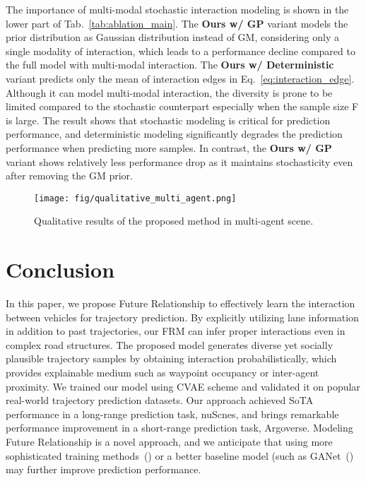 \documentclass{article} \usepackage{iclr2023_conference,times}
\begin{document}
The importance of multi-modal stochastic interaction modeling is shown in the lower part of Tab.~\ref{tab:ablation_main}.
The \textbf{Ours w/ GP} variant models the prior distribution as Gaussian distribution instead of GM, considering only a single modality of interaction, which leads to a performance decline compared to the full model with multi-modal interaction.
The \textbf{Ours w/ Deterministic} variant predicts only the mean of interaction edges in Eq.~\ref{eq:interaction_edge}.
Although it can model multi-modal interaction, the diversity is prone to be limited compared to the stochastic counterpart especially when the sample size F is large.
The result shows that stochastic modeling is critical for prediction performance, and deterministic modeling significantly degrades the prediction performance when predicting more samples.
In contrast, the \textbf{Ours w/ GP} variant shows relatively less performance drop as it maintains stochasticity even after removing the GM prior.



\begin{figure}
  \centering
  \hspace*{-0.0\linewidth}\texttt{[image: fig/qualitative\_multi\_agent.png]}
  \vspace{-5pt}
  \caption{Qualitative results of the proposed method in multi-agent scene.}  
  \label{fig:qualatative_samples}
  \vspace{-10pt}
\end{figure}

\vspace{-5pt}
\section{Conclusion}
\label{sec:conclusion}
\vspace{-5pt}

In this paper, we propose Future Relationship to effectively learn the interaction between vehicles for trajectory prediction.
By explicitly utilizing lane information in addition to past trajectories, our FRM can infer proper interactions even in complex road structures.
The proposed model generates diverse yet socially plausible trajectory samples by obtaining interaction probabilistically, which provides explainable medium such as waypoint occupancy or inter-agent proximity.
We trained our model using CVAE scheme and validated it on popular real-world trajectory prediction datasets.
Our approach achieved SoTA performance in a long-range prediction task, nuScnes, and brings remarkable performance improvement in a short-range prediction task, Argoverse.
Modeling Future Relationship is a novel approach, and we anticipate that using more sophisticated training methods~(\cite{ye2022dcms, zhou2022hivt}) or a better baseline model (such as GANet~(\cite{wang2022ganet}) may further improve prediction performance.
\end{document}
